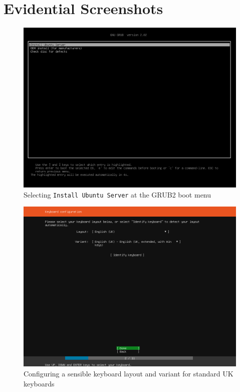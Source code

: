 \section{Evidential Screenshots}
\begin{figure}[h!]
\centering
\captionsetup{skip=\skipfigurecaptionlen}
\includegraphics[width=1\textwidth]{screenshots/IY2D502-2019-02-21-19-15-19.png}
\caption{Selecting \texttt{Install Ubuntu Server} at the GRUB2 boot menu}
\label{fig:IY2D502-2019-02-21-19-15-19}
\end{figure}
\pagebreak
\begin{figure}[h!]
\centering
\captionsetup{skip=\skipfigurecaptionlen}
\includegraphics[width=1\textwidth]{screenshots/IY2D502-2019-02-21-19-16-03.png}
\caption{Configuring a sensible keyboard layout and variant for standard UK keyboards}
\label{fig:IY2D502-2019-02-21-19-16-03}
\end{figure}
